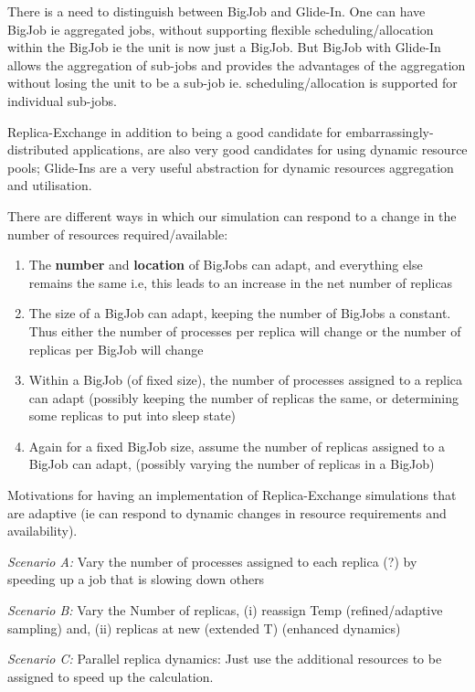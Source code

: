 \documentclass{rspublic}
\begin{document}
{There is a need to distinguish between BigJob and Glide-In. One can
have BigJob ie aggregated jobs, without supporting flexible
scheduling/allocation within the BigJob ie the unit is now just a
BigJob. But BigJob with Glide-In allows the aggregation of sub-jobs
and provides the advantages of the aggregation without losing the unit
to be a sub-job ie. scheduling/allocation is supported for individual
sub-jobs.

Replica-Exchange in addition to being a good candidate for
embarrassingly-distributed applications, are also very good candidates
for using dynamic resource pools; Glide-Ins are a very useful
abstraction for dynamic resources aggregation and utilisation.

There are different ways in which our simulation can respond
to a change in the number of resources required/available:

\begin{enumerate}
\item The {\bf number} and {\bf location} of BigJobs can adapt, and
  everything else remains the same i.e, this leads to an increase in
  the net number of replicas
\item The size of a BigJob can adapt, keeping the number of BigJobs a
  constant. Thus either the number of processes per replica will
  change or the number of replicas per BigJob will change
\item Within a BigJob (of fixed size), the number of processes
  assigned to a replica can adapt (possibly keeping the number of
  replicas the same, or determining some replicas to put into sleep
  state)
\item Again for a fixed BigJob size, assume the number of replicas
  assigned to a BigJob can adapt, (possibly varying the number of
  replicas in a BigJob)
\end{enumerate}

Motivations for having an implementation of Replica-Exchange
simulations that are adaptive (ie can respond to dynamic changes in
resource requirements and availability).

{\it Scenario A:} Vary the number of processes assigned to each
replica (?) by speeding up a job that is slowing down others

{\it Scenario B:} Vary the Number of replicas, (i) reassign Temp
(refined/adaptive sampling) and, (ii) replicas at new (extended T)
(enhanced dynamics)

{\it Scenario C:} Parallel replica dynamics: Just use the additional
resources to be assigned to speed up the calculation.

}
\end{document}
